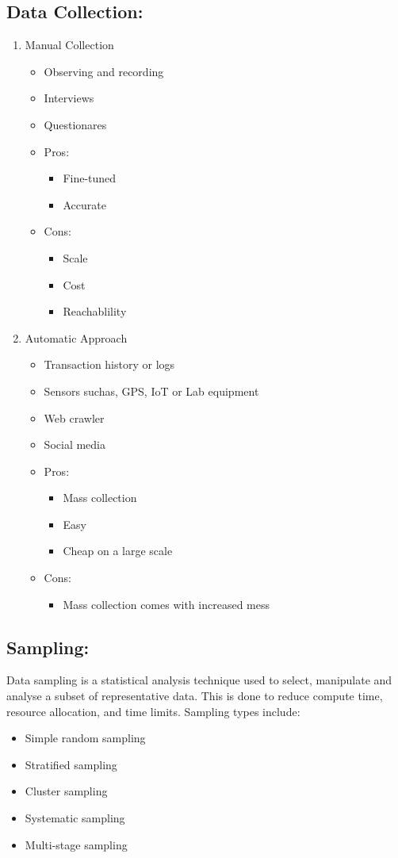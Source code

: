 \documentclass[a5paper]{article}
\begin{document}
	\subsection{Data Collection:}
	\begin{enumerate}
		\item Manual Collection
			\begin{itemize}
				\item Observing and recording
				\item Interviews
				\item Questionares
				\item Pros:
					\begin{itemize}
						\item Fine-tuned
						\item Accurate
					\end{itemize}
				\item Cons:
					\begin{itemize}
						\item Scale
						\item Cost
						\item Reachablility
					\end{itemize}
			\end{itemize}
		\item Automatic Approach
			\begin{itemize}
				\item Transaction history or logs
				\item Sensors suchas, GPS, IoT or Lab equipment
				\item Web crawler
				\item Social media
				\item Pros:
					\begin{itemize}
						\item Mass collection
						\item Easy
						\item Cheap on a large scale
					\end{itemize}
				\item Cons:
					\begin{itemize}
						\item Mass collection comes with increased mess
					\end{itemize}
			\end{itemize}
	\end{enumerate}
	\subsection{Sampling:}
	Data sampling is a statistical analysis technique used to select, manipulate and analyse a subset of representative data. This is done to reduce compute time, resource allocation, and time limits. Sampling types include:
	\begin{itemize}
		\item Simple random sampling
		\item Stratified sampling
		\item Cluster sampling
		\item Systematic sampling
		\item Multi-stage sampling
	\end{itemize}
\end{document}
